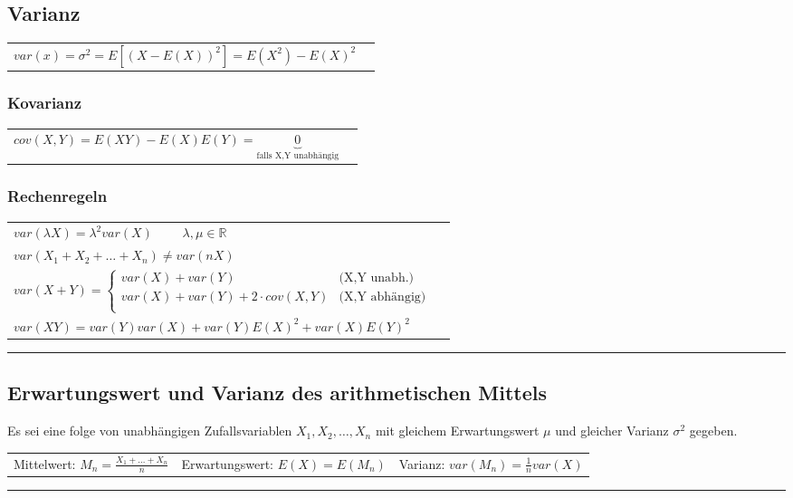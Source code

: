 \begin{minipage}{9cm}
\subsection{Varianz }
  \begin{tabular}{ll}
    $var(x)=\sigma ^2=E[(X-E(X))^2]=E(X^2)-E(X)^2$\\
	\end{tabular}
	\subsubsection{Kovarianz}
	\begin{tabular}{ll}
	  $cov(X,Y)=E(XY)-E(X)E(Y)=\underbrace{0}_{\text{falls X,Y unabhängig}}$
	\end{tabular}
\end{minipage}
\begin{minipage}{9cm}
  \subsubsection{Rechenregeln}
  \begin{tabular}{ll}
    $var(\lambda X)=\lambda^2 var(X) \qquad $ $\lambda, \mu
    \in \mathbb{R}$\\
    $var(X_1+X_2+\ldots+X_n) \neq var(n X)$ \\
    $var(X+Y)= \begin{cases}
      var(X)+var(Y)                      &	\text{(X,Y unabh.)}\\                     
      var(X) + var(Y) + 2 \cdot cov(X,Y) &	\text{(X,Y abhängig)}\\
    \end{cases} $ \\
    $var(X Y)= var(Y)var(X)+var(Y)E(X)^2+var(X)E(Y)^2$
  \end{tabular}
\end{minipage}
\vspace{1mm}
\hrule

\subsection{Erwartungswert und Varianz des arithmetischen Mittels }
Es sei eine folge von unabhängigen Zufallsvariablen $X_1, X_2, \ldots , X_n$ mit
gleichem Erwartungswert $ \mu $ und gleicher Varianz $ \sigma^2 $ gegeben. \\
\begin{tabular}{p{6cm} p{6cm} p{6cm}}
  Mittelwert: $M_n=\frac{X_1+\ldots+X_n}{n}$ &
  Erwartungswert: $E(X)=E(M_n)$ &
  Varianz: $var(M_n)=\frac{1}{n}var(X)$
\end{tabular}
\vspace{1mm}
\hrule
\vspace{2mm}

